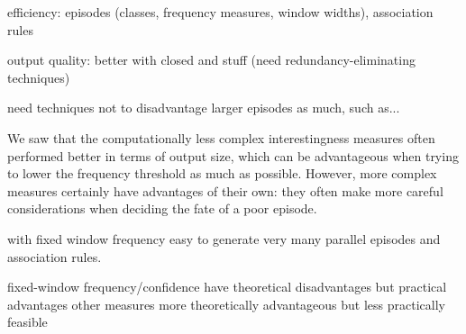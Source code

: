 efficiency: episodes (classes, frequency measures, window widths), association rules

output quality: better with closed and stuff (need redundancy-eliminating techniques)

need techniques not to disadvantage larger episodes as much, such as...

We saw that the computationally less complex interestingness measures often performed better in terms of output size, which can be advantageous when trying to lower the frequency threshold as much as possible. However, more complex measures certainly have advantages of their own: they often make more careful considerations when deciding the fate of a poor episode.

with fixed window frequency easy to generate very many parallel episodes and association rules.

fixed-window frequency/confidence have theoretical disadvantages but practical advantages
other measures more theoretically advantageous but less practically feasible
